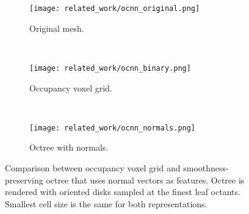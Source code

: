 \begin{figure}[ht]
    \centering
    \begin{subfigure}[ht]{0.325\textwidth}
        \centering
        \texttt{[image: related\_work/ocnn\_original.png]}
        \caption*{Original mesh.}
    \end{subfigure}%
    ~
    \begin{subfigure}[ht]{0.325\textwidth}
        \centering
        \texttt{[image: related\_work/ocnn\_binary.png]}
        \caption*{Occupancy voxel grid.}
    \end{subfigure}%
    ~
    \begin{subfigure}[ht]{0.325\textwidth}
        \centering
        \texttt{[image: related\_work/ocnn\_normals.png]}
        \caption*{Octree with normals.}
    \end{subfigure}%
    \caption{Comparison between occupancy voxel grid and smoothness-preserving octree that uses normal vectors as features. Octree is rendered with oriented disks sampled at the finest leaf octants. Smallest cell size is the same for both representations. \protect\cite{wang_o-cnn_2017}}
    \label{fig:rw_ocnn_occupancy_vs_normals}
\end{figure}

